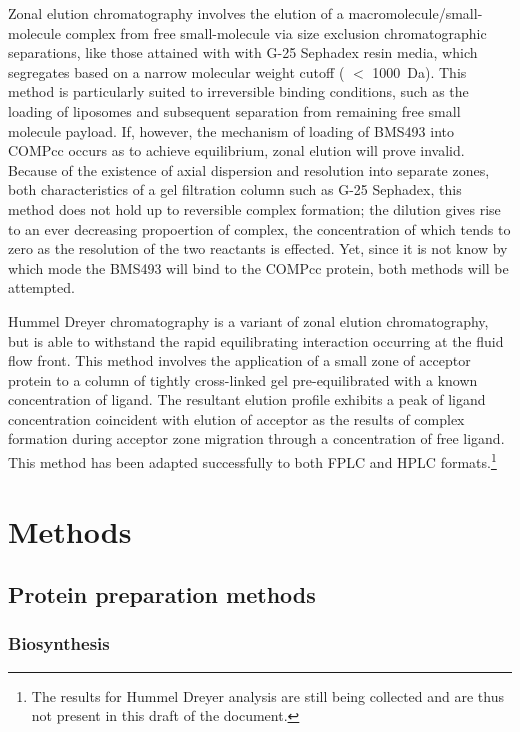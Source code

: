 \begin{refsection}
Zonal elution chromatography involves the elution of a
macromolecule/small-molecule complex from free small-molecule via size exclusion
chromatographic separations, like those attained with with G-25 Sephadex resin
media, which segregates based on a narrow molecular weight cutoff ( ${<}$
\SI{1000}{\dalton}). This method is particularly suited to irreversible binding
conditions, such as the loading of liposomes and subsequent separation from
remaining free small molecule payload.\cite{Pan2012,Wang2013} If, however, the
mechanism of loading of BMS493 into COMPcc occurs as to achieve equilibrium,
zonal elution will prove invalid. Because of the existence of axial dispersion
and resolution into separate zones, both characteristics of a gel filtration
column such as G-25 Sephadex, this method does not hold up to reversible complex
formation; the dilution gives rise to an ever decreasing propoertion of complex,
the concentration of which tends to zero as the resolution of the two reactants
is effected.\cite{Winzor2001} Yet, since it is not know by which mode the BMS493
will bind to the COMPcc protein, both methods will be attempted.
 
Hummel Dreyer chromatography is a variant of zonal elution chromatography, but
is able to withstand the rapid equilibrating interaction occurring at the fluid flow
front. This method involves the application of a small zone of acceptor protein
to a column of tightly cross-linked gel pre-equilibrated with a known
concentration of ligand.\cite{Hummel1962} The resultant elution profile exhibits
a peak of ligand concentration coincident with elution of acceptor as the
results of complex formation during acceptor zone migration through a
concentration of free ligand. This method has been adapted successfully to both
FPLC and HPLC formats.\cite{Bieri1998}\footnote{The results for Hummel Dreyer
    analysis are still being collected and are thus not present in this draft of
the document.}

\section{Methods}

\subsection{Protein preparation methods}

\subsubsection{Biosynthesis}


\end{refsection}

